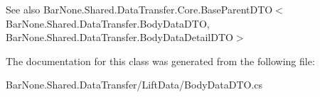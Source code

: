 \begin{DoxySeeAlso}{See also}
Bar\+None.\+Shared.\+Data\+Transfer.\+Core.\+Base\+Parent\+D\+T\+O$<$\+Bar\+None.\+Shared.\+Data\+Transfer.\+Body\+Data\+D\+T\+O, Bar\+None.\+Shared.\+Data\+Transfer.\+Body\+Data\+Detail\+D\+T\+O$>$


\end{DoxySeeAlso}


The documentation for this class was generated from the following file\+:\begin{DoxyCompactItemize}
\item 
Bar\+None.\+Shared.\+Data\+Transfer/\+Lift\+Data/Body\+Data\+D\+T\+O.\+cs\end{DoxyCompactItemize}

